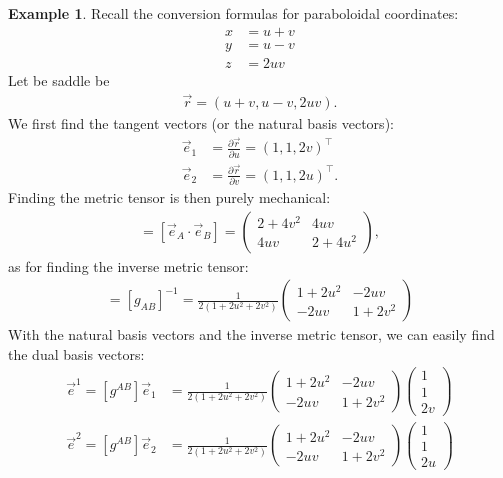 \documentclass{book}
\theoremstyle{definition}
\newtheorem{exmp}{Example}[section]
\begin{document}
\begin{exmp}
	Recall the conversion formulas for paraboloidal coordinates:
	\begin{align*}
	x &= u+v\\
	y &= u-v\\
	z &= 2uv
	\end{align*}
	Let be saddle be
	\begin{align*}
	\vec{r} = (u+v, u-v, 2uv).
	\end{align*}
	We first find the tangent vectors (or the natural basis vectors):
	\begin{align*}
	\vec{e}_1 &= \frac{\partial \vec{r}}{\partial u} = (1,1,2v)^\top\\
	\vec{e}_2 &= \frac{\partial \vec{r}}{\partial v} = (1,1,2u)^\top.
	\end{align*}
	Finding the metric tensor is then purely mechanical:
	\begin{align*}
	[g_{AB}] = [\vec{e}_A\cdot\vec{e}_B] = 
	\begin{pmatrix}
	2 + 4v^2 & 4uv\\
	4uv & 2+4u^2
	\end{pmatrix},
	\end{align*}
	as for finding the inverse metric tensor:
	\begin{align*}
	[g^{AB}] = [g_{AB}]^{-1} = 
	\frac{1}{2(1+2u^2+2v^2)}
	\begin{pmatrix}
	1 + 2u^2 & -2uv\\
	-2uv & 1+2v^2
	\end{pmatrix}
	\end{align*}
	With the natural basis vectors and the inverse metric tensor, we can easily find the dual basis vectors:
	\begin{align*}
	\vec{e}^1 = [g^{AB}]\vec{e}_1 &= 
	\frac{1}{2(1+2u^2+2v^2)}
	\begin{pmatrix}
	1 + 2u^2 & -2uv\\
	-2uv & 1+2v^2
	\end{pmatrix}
	\begin{pmatrix}
	1 \\ 1 \\ 2v
	\end{pmatrix}\\
	\vec{e}^2 = [g^{AB}]\vec{e}_2 &= 
	\frac{1}{2(1+2u^2+2v^2)}
	\begin{pmatrix}
	1 + 2u^2 & -2uv\\
	-2uv & 1+2v^2
	\end{pmatrix}
	\begin{pmatrix}
	1 \\ 1 \\ 2u
	\end{pmatrix}
	\end{align*}
\end{exmp}
\end{document}
